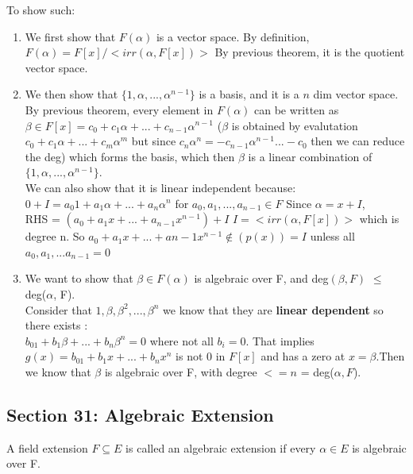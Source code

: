 \documentclass{article}
\begin{document}
\begin{Proof} To show such:

    \begin{enumerate}
        \item We first show that $F(\alpha)$ is a vector space. By definition, 
        \\$F(\alpha) =F[x]/<irr(\alpha, F[x])>$ By previous theorem, it is the quotient vector space.
        \item We then show that $\{1, \alpha, ..., \alpha^{n-1} \}$ is a basis, and it is a $n$ dim vector space.
        By previous theorem, every element in $F(\alpha)$ can be written as $\beta \in F[x] = c_0+c_1 \alpha + ... + c_{n-1} \alpha ^{n-1}$ ($\beta$ is obtained by evalutation $c_0+c_1\alpha + ...+ c_m\alpha ^m$ but since $c_n\alpha^n = -c_{n-1}\alpha^{n-1}...- c_0$ then we can reduce the deg) which forms the basis, which then $\beta$ is a linear combination of $\{1, \alpha, ..., \alpha^{n-1} \}$.
        \\ We can also show that it is linear independent because:
        $0+I = a_0 1+ a_1\alpha + ... +a_n\alpha^n$ for $a_0, a_1, ..., a_{n-1} \in F$ Since $\alpha = x + I$, 
        \\RHS = $(a_0+a_1x + ...+ a_{n-1}x^{n-1}) + I$ $I = <irr (\alpha, F[x])>$ which is degree n. So $a_0+a_1x+...+a{n-1}x^{n-1} \notin (p(x)) = I$ unless all $a_0, a_1,...a_{n-1} = 0$
        \item We want to show that $\beta \in F(\alpha)$ is algebraic over F, and deg$(\beta, F)$ $\leq$ deg($\alpha$, F).
        \\Consider that $1, \beta, \beta^2, ..., \beta^n$ we know that they are \textbf{linear dependent} so there exists :
        \\ $b_01 + b_1\beta + ...+b_n \beta^n = 0$ where not all $b_i = 0$. That implies $g(x) = b_01 + b_1x + ...+b_n x^n$ is not 0 in $F[x]$ and has a zero at $x = \beta$.Then we know that $\beta$ is algebraic over F, with degree $<= n $ = deg($\alpha, F$).
    \end{enumerate}
\end{Proof}
\newpage

\subsection{Section 31: Algebraic Extension}
\begin{Def}
    A field extension $F \subseteq E$ is called an algebraic extension if every $\alpha \in E$ is algebraic over F.
\end{Def}
\end{document}
